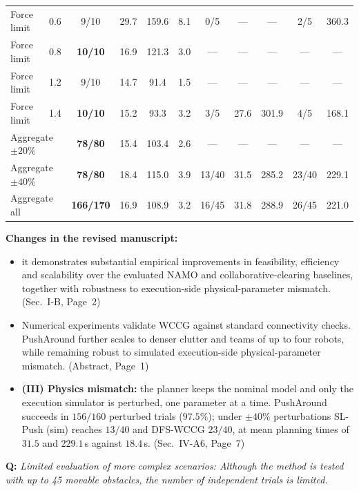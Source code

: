 \documentclass[11pt]{article}
\newcommand{\change}[1]{{\color{blue}#1}}
\begin{document}
\begin{table}[!ht]
\begin{tabular}{llccccccccc}
Force limit        & 0.6 & 9/10 & 29.7 & 159.6 & 8.1 & 0/5 & --- & --- & 2/5 & 360.3\\
Force limit        & 0.8 & \textbf{10/10} & 16.9 & 121.3 & 3.0 & --- & --- & --- & --- & ---\\
Force limit        & 1.2 & 9/10 & 14.7 & 91.4  & 1.5 & --- & --- & --- & --- & ---\\
Force limit        & 1.4 & \textbf{10/10} & 15.2 & 93.3  & 3.2 & 3/5 & 27.6 & 301.9 & 4/5 & 168.1\\
\midrule
\multicolumn{2}{l}{Aggregate $\pm20\%$}  & \textbf{78/80} & 15.4 & 103.4 & 2.6 & --- & --- & --- & --- & ---\\
\multicolumn{2}{l}{Aggregate $\pm40\%$}  & \textbf{78/80} & 18.4 & 115.0 & 3.9 & 13/40 & 31.5 & 285.2 & 23/40 & 229.1\\
\multicolumn{2}{l}{Aggregate all}        & \textbf{166/170} & 16.9 & 108.9 & 3.2 & 16/45 & 31.8 & 288.9 & 26/45 & 221.0\\
\bottomrule
\end{tabular}
\vspace{-4mm}
\end{table}


\noindent\textbf{Changes in the revised manuscript:}

\begin{itemize}
\item \change{it demonstrates substantial empirical improvements in feasibility, efficiency and scalability over the evaluated NAMO and collaborative-clearing baselines, together with robustness to execution-side physical-parameter mismatch.} (Sec.~I-B, Page~2)
\item \change{Numerical experiments validate WCCG against standard connectivity checks. PushAround further scales to denser clutter and teams of up to four robots, while remaining robust to simulated execution-side physical-parameter mismatch.} (Abstract, Page~1)
\item \change{\textbf{(III) Physics mismatch:} the planner keeps the nominal model and only the execution simulator is perturbed, one parameter at a time. PushAround succeeds in $156/160$ perturbed trials ($97.5\%$); under $\pm40\%$ perturbations SL-Push (sim) reaches $13/40$ and DFS-WCCG $23/40$, at mean planning times of $31.5$ and $229.1$\,s against $18.4$\,s.} (Sec.~IV-A6, Page~7)
\end{itemize}

\begin{shaded*}
\noindent \textbf{Q:}
{\itshape
Limited evaluation of more complex scenarios: Although the method is
tested with up to 45 movable obstacles, the number of independent
trials is limited.
}
\end{shaded*}
\end{document}

